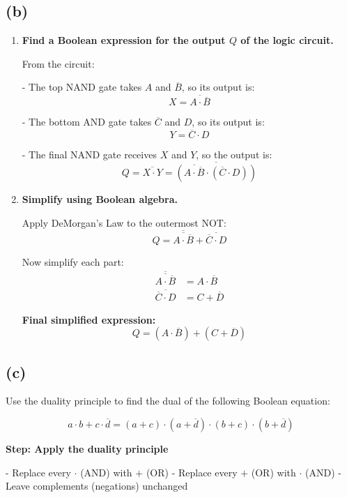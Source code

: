 \documentclass{article}
\begin{document}
\subsection*{(b)}

\begin{enumerate}[label=\roman*.]

\item \textbf{Find a Boolean expression for the output \( Q \) of the logic circuit.}

From the circuit:

- The top NAND gate takes \( A \) and \( \overline{B} \), so its output is:
  \[
  X = \overline{A \cdot \overline{B}}
  \]

- The bottom AND gate takes \( \overline{C} \) and \( D \), so its output is:
  \[
  Y = \overline{C} \cdot D
  \]

- The final NAND gate receives \( X \) and \( Y \), so the output is:
  \[
  Q = \overline{X \cdot Y} = \overline{ \left( \overline{A \cdot \overline{B}} \cdot ( \overline{C} \cdot D ) \right) }
  \]

\item \textbf{Simplify using Boolean algebra.}

Apply DeMorgan’s Law to the outermost NOT:
\[
Q = \overline{ \overline{A \cdot \overline{B}} } + \overline{ \overline{C} \cdot D }
\]

Now simplify each part:
\begin{align*}
\overline{ \overline{A \cdot \overline{B}} } &= A \cdot \overline{B} \\
\overline{ \overline{C} \cdot D } &= C + \overline{D}
\end{align*}

\textbf{Final simplified expression:}
\[
\boxed{Q = (A \cdot \overline{B}) + (C + \overline{D})}
\]

\end{enumerate}

\subsection*{(c)}

Use the duality principle to find the dual of the following Boolean equation:

\[
a \cdot b + c \cdot \overline{d} = (a + c) \cdot (a + \overline{d}) \cdot (b + c) \cdot (b + \overline{d})
\]

\textbf{Step: Apply the duality principle}

- Replace every \( \cdot \) (AND) with \( + \) (OR)
- Replace every \( + \) (OR) with \( \cdot \) (AND)
- Leave complements (negations) unchanged
\end{document}
